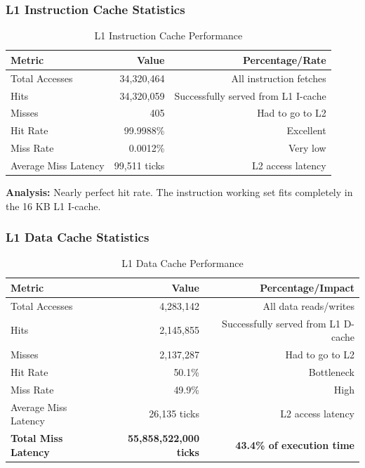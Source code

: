 \documentclass[11pt,a4paper]{article}
\begin{document}
\subsubsection{L1 Instruction Cache Statistics}

\begin{table}[H]
\centering
\caption{L1 Instruction Cache Performance}
\begin{tabular}{lrr}
\toprule
\textbf{Metric} & \textbf{Value} & \textbf{Percentage/Rate} \\
\midrule
Total Accesses & 34,320,464 & All instruction fetches \\
Hits & 34,320,059 & Successfully served from L1 I-cache \\
Misses & 405 & Had to go to L2 \\
Hit Rate & 99.9988\% & Excellent \\
Miss Rate & 0.0012\% & Very low \\
Average Miss Latency & 99,511 ticks & L2 access latency \\
\bottomrule
\end{tabular}
\end{table}

\textbf{Analysis:} Nearly perfect hit rate. The instruction working set fits completely in the 16 KB L1 I-cache.

\subsubsection{L1 Data Cache Statistics}

\begin{table}[H]
\centering
\caption{L1 Data Cache Performance}
\begin{tabular}{lrr}
\toprule
\textbf{Metric} & \textbf{Value} & \textbf{Percentage/Impact} \\
\midrule
Total Accesses & 4,283,142 & All data reads/writes \\
Hits & 2,145,855 & Successfully served from L1 D-cache \\
Misses & 2,137,287 & Had to go to L2 \\
Hit Rate & 50.1\% & Bottleneck \\
Miss Rate & 49.9\% & High \\
Average Miss Latency & 26,135 ticks & L2 access latency \\
\textbf{Total Miss Latency} & \textbf{55,858,522,000 ticks} & \textbf{43.4\% of execution time} \\
\bottomrule
\end{tabular}
\end{table}
\end{document}
